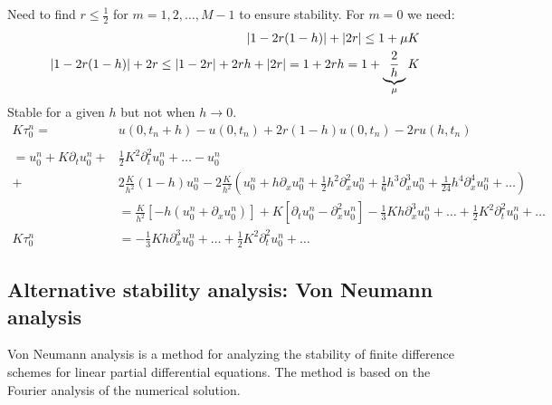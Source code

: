 \documentclass[a4paper, 10pt]{article}
\begin{document}
\begin{example}{}{}
    Need to find \( r \leq \frac{1}{2} \) for \(m = 1, 2, \ldots, M-1\) to ensure stability.
    For \( m = 0 \) we need:
    \begin{align*}
        \lvert1 - 2r(1 - h)\rvert + \lvert2r\rvert \leq 1 + \mu K \\
        \lvert1 - 2r(1 - h)\rvert + 2r \leq \lvert1 - 2r\rvert + 2rh + \lvert2r\rvert = 1 + 2rh = 1 + \underbrace{\frac{2}{h}}_{\mu}K
    \end{align*}
    Stable for a given \( h \) but not when \( h \to 0 \).
    \begin{align*}
        K \tau_0^n =                              & u(0, t_n + h) - u(0, t_n) + 2r(1 - h)u(0, t_n) - 2ru(h, t_n)                                                                                                                                            \\                                                                                                                                                                                                                    \\
        =            u_0^n + K \partial_t u_0^n + & \frac{1}{2}K^2 \partial_t^2 u_0^n + \ldots - u_0^n                                                                                                                                                      \\
        +                                         & 2\frac{K}{h^2}(1 - h)u_0^n - 2\frac{K}{h^2}(u_0^n + h \partial_x u_0^n + \frac{1}{2}h^2 \partial_x^2 u_0^n + \frac{1}{6}h^3 \partial_x^3 u_0^n + \frac{1}{24}h^4 \partial_x^4 u_0^n + \ldots)           \\
                                                  & = \frac{K}{h^2}\left[-h(u_0^n + \partial_x u_0^n)\right] + K \left[\partial_t u_0^n - \partial_x^2 u_0^n\right] - \frac{1}{3}Kh\partial_x^3 u_0^n + \ldots + \frac{1}{2}K^2 \partial_t^2 u_0^n + \ldots \\
        K \tau_0^n                                & = -\frac{1}{3}Kh\partial_x^3 u_0^n + \ldots + \frac{1}{2}K^2 \partial_t^2 u_0^n + \ldots \tag{Consistency}
    \end{align*}
\end{example}

\subsection*{Alternative stability analysis: Von Neumann analysis}
Von Neumann analysis is a method for analyzing the stability of finite difference schemes for linear partial differential equations.
The method is based on the Fourier analysis of the numerical solution.
\end{document}
